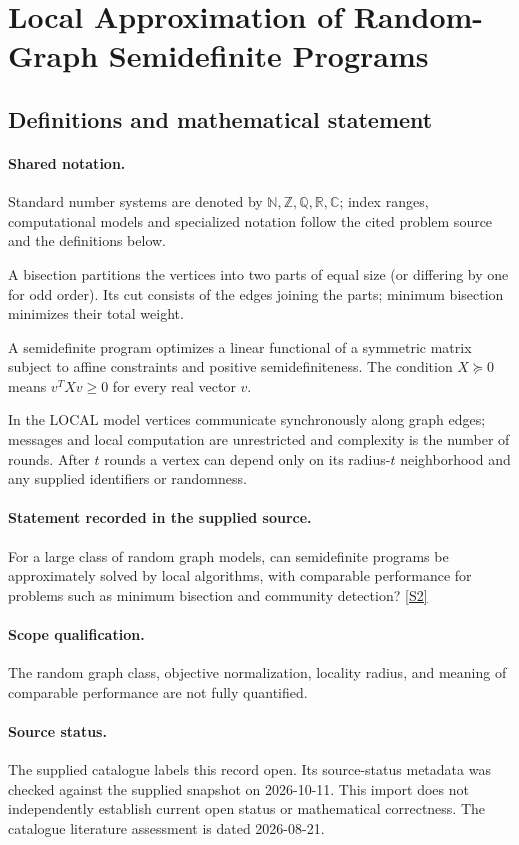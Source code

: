 \documentclass[11pt]{article}
\newcommand{\sref}[2]{\hyperlink{source:#1:#2}{[S#2]}}
\begin{document}
\section{Local Approximation of Random-Graph Semidefinite Programs}\label{statement}

\subsection{Definitions and mathematical statement}

\paragraph{Shared notation.}Standard number systems are denoted by $\mathbb N,\mathbb Z,\mathbb Q,\mathbb R,\mathbb C$; index ranges, computational models and specialized notation follow the cited problem source and the definitions below.


A bisection partitions the vertices into two parts of equal size (or differing by one for odd order). Its cut consists of the edges joining the parts; minimum bisection minimizes their total weight.

A semidefinite program optimizes a linear functional of a symmetric matrix subject to affine constraints and positive semidefiniteness. The condition $X\succeq0$ means $v^TXv\geq0$ for every real vector $v$.

In the LOCAL model vertices communicate synchronously along graph edges; messages and local computation are unrestricted and complexity is the number of rounds. After $t$ rounds a vertex can depend only on its radius-$t$ neighborhood and any supplied identifiers or randomness.
\paragraph{Statement recorded in the supplied source.}
For a large class of random graph models, can semidefinite programs be approximately solved by local algorithms, with comparable performance for problems such as minimum bisection and community detection? \sref{statement}{2}
\paragraph{Scope qualification.}
The random graph class, objective normalization, locality radius, and meaning of comparable performance are not fully quantified.
\paragraph{Source status.}
The supplied catalogue labels this record open. Its source-status metadata was checked against the supplied snapshot on 2026-10-11. This import does not independently establish current open status or mathematical correctness. The catalogue literature assessment is dated 2026-08-21.
\end{document}
